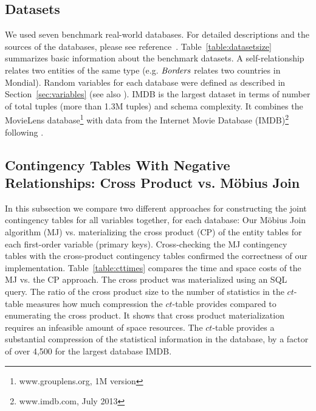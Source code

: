 \documentclass{sig-alternate-2013}
\newcommand{\ct}{\mathit{ct}}
\begin{document}
\subsection{Datasets}
We used seven benchmark real-world databases. For detailed descriptions and  the sources of the databases, please see reference~\cite{Schulte2012}. Table~\ref{table:datasetsize} summarizes basic information about the benchmark datasets.  A  self-relationship %
relates two entities of the same type (e.g. $\it{Borders}$ relates two countries in Mondial). Random variables for each database were defined as described in Section~\ref{sec:variables} (see also \cite{Schulte2012}). IMDB is the largest dataset in terms of number of total tuples (more than 1.3M tuples) and schema complexity. %
It combines the MovieLens database\footnote{www.grouplens.org, 1M version} with data from the Internet Movie Database (IMDB)\footnote{www.imdb.com, July 2013} following \cite{Peralta2007}.





\subsection{Contingency Tables With Negative Relationships: Cross Product vs. M\"obius Join}


In this subsection we compare two different approaches for constructing the joint contingency tables for all variables together, for each database: Our M\"obius Join algorithm (MJ) vs. materializing the cross product (CP) of the entity tables for each first-order variable (primary keys).
Cross-checking the MJ contingency tables with the cross-product contingency tables confirmed the correctness of our implementation. Table~\ref{table:cttimes} compares the time and space costs of the MJ vs. the CP approach. The cross product was materialized using an SQL query. 
The ratio of the cross product size to the number of statistics in the $\ct$-table measures how much compression the $\ct$-table provides compared to enumerating the cross product. 
It shows that cross product materialization  requires an infeasible amount of space resources.
The $\ct$-table provides a substantial compression of the statistical information in the database, by a factor of over 4,500 for the largest database IMDB.  
\end{document}

